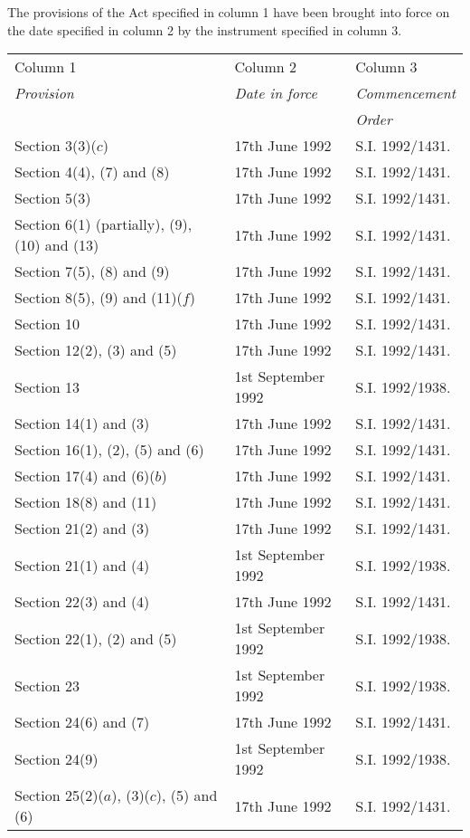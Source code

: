 \documentclass[12pt,a4paper]{article}
\begin{document}
 The provisions of the Act specified in column 1 have been brought into force on the date specified in column 2 by the instrument specified in column 3.

{\noindent\footnotesize
\begin{longtable}{p{134pt}p{100pt}p{75pt}}
\hline
Column 1 & Column 2 & Column 3\\
\itshape Provision & \itshape Date in force & \itshape Commencement\\
&&\itshape Order\\
\hline
\endhead
\hline
\endlastfoot
Section 3(3)($c$)&17th June 1992&S.I. 1992/1431.\\
Section 4(4), (7) and (8)&17th June 1992&S.I. 1992/1431.\\
Section 5(3)&17th June 1992&S.I. 1992/1431.\\
Section 6(1) (partially), (9), (10) and (13)&17th June 1992&S.I. 1992/1431.\\
Section 7(5), (8) and (9)&17th June 1992&S.I. 1992/1431.\\
Section 8(5), (9) and (11)($f$)&17th June 1992&S.I. 1992/1431.\\
Section 10&17th June 1992&S.I. 1992/1431.\\
Section 12(2), (3) and (5)&17th June 1992&S.I. 1992/1431.\\
Section 13&1st September 1992&S.I. 1992/1938.\\
Section 14(1) and (3)&17th June 1992&S.I. 1992/1431.\\
Section 16(1), (2), (5) and (6)&17th June 1992&S.I. 1992/1431.\\
Section 17(4) and (6)($b$)&17th June 1992&S.I. 1992/1431.\\
Section 18(8) and (11)&17th June 1992&S.I. 1992/1431.\\
Section 21(2) and (3)&17th June 1992&S.I. 1992/1431.\\
Section 21(1) and (4)&1st September 1992&S.I. 1992/1938.\\
Section 22(3) and (4)&17th June 1992&S.I. 1992/1431.\\
Section 22(1), (2) and (5)&1st September 1992&S.I. 1992/1938.\\
Section 23&1st September 1992&S.I. 1992/1938.\\
Section 24(6) and (7)&17th June 1992&S.I. 1992/1431.\\
Section 24(9)&1st September 1992&S.I. 1992/1938.\\
Section 25(2)($a$), (3)($c$), (5) and (6)&17th June 1992&S.I. 1992/1431.\\

\end{longtable}}
\end{document}
